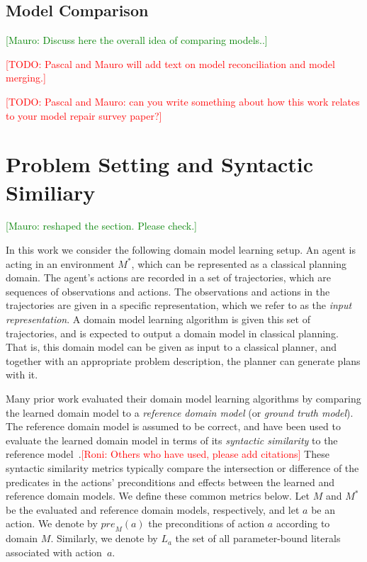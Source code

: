 \documentclass{article}
\theoremstyle{definition}
\theoremstyle{remark}
\newcommand{\realm}{\ensuremath{M^*}\xspace}
\newcommand{\pre}{\ensuremath{\textit{pre}}\xspace}
\newcommand{\todo}[1]{{\textcolor{red}{[TODO: #1]}}}
\newcommand{\roni}[1]{{\textcolor{red}{[Roni: #1]}}}
\newcommand{\mauro}[1]{{\textcolor{green}{[Mauro: #1]}}}
\begin{document}
\subsection{Model Comparison}

\mauro{Discuss here the overall idea of comparing models..}

\todo{Pascal and Mauro will add text on model reconciliation and model merging.}

\todo{Pascal and Mauro: can you write something about how this work relates to your model repair survey paper?}





\section{Problem Setting and Syntactic Similiary}
\label{sec:problem-setting}

\mauro{reshaped the section. Please check.}

In this work we consider the following domain model learning setup. 
An agent is acting in an environment $\realm$, 
which can be represented as a classical planning domain. 
The agent's actions are recorded in a set of trajectories, which are sequences of observations and actions. 
The observations and actions in the trajectories are given in a specific representation, which we refer to as the \emph{input representation}. 
A domain model learning algorithm is given this set of trajectories, and is expected to output a domain model in classical planning. 
That is, this domain model can be given as input to a classical planner, and together with an appropriate problem description, the planner can generate plans with it. 



Many prior work evaluated their domain model learning algorithms by comparing the learned domain model to a \emph{reference domain model} (or \emph{ground truth model}). 
The reference domain model is assumed to be correct, and have been used to evaluate the learned domain model in terms of its \emph{syntactic similarity} to the reference model~\citep{aineto2019learning,mordoch2023safe,xi2024neuro}.\roni{Others who have used, please add citations}
These syntactic similarity metrics typically compare the intersection or difference of the predicates in the actions' preconditions and effects between the learned and reference domain models. We define these common metrics below. 
Let $M$ and $\realm$ be the evaluated and reference domain models, respectively, and let $a$ be an action. We denote by $\pre_M(a)$ the preconditions of action $a$ according to domain $M$.
Similarly, we denote by $L_a$ the set of all parameter-bound literals associated with action~$a$.
\end{document}

